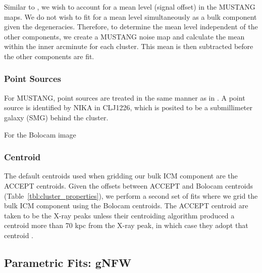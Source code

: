 \documentclass[iop,numberedappendix,apj]{emulateapj}
\begin{document}
{%
Similar to \citet{czakon2015}, we wish to account for a mean level (signal offset) in the MUSTANG maps.
We do not wish to fit for a mean level simultaneously as a bulk component given the degeneracies. Therefore,
to determine the mean level independent of the other components, we create a MUSTANG noise map
and calculate the mean within the inner arcminute for each cluster. This mean is then subtracted before 
the other components are fit. 

\subsubsection{Point Sources}
\label{sec:ptsrcs}

For MUSTANG, point sources are treated in the same manner as in \citet{romero2015a}. 
A point source is identified by NIKA \citep{adam2015} in CLJ1226, which is posited to be a submillimeter galaxy (SMG) 
behind the cluster. 

For the Bolocam image

\subsubsection{Centroid}

The default centroids used when gridding our bulk ICM component are the ACCEPT centroids. Given the offsets
between ACCEPT and Bolocam centroids (Table~\ref{tbl:cluster_properties}), we perform a second set of
fits where we grid the bulk ICM component using the Bolocam centroids. The ACCEPT centroid are taken to be the
X-ray peaks unless their centroiding algorithm produced a centroid more than 70 kpc from the X-ray peak, in which
case they adopt that centroid \citep{cavagnolo2008a}. 

\subsection{Parametric Fits: gNFW}
\label{sec:parfits}

}
\end{document}
